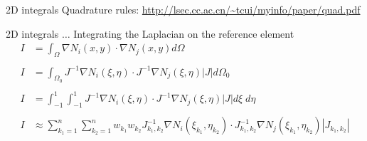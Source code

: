 \documentclass[handout]{beamer}
{
\usepackage{fullpage}
\usepackage{hyperref}
\usepackage{amssymb} 
}
\begin{document}
\begin{frame}{2D integrals}
  \centering
Quadrature rules:
\url{http://lsec.cc.ac.cn/~tcui/myinfo/paper/quad.pdf}

\end{frame}

\begin{frame}{2D integrals $\ldots$}
Integrating the Laplacian on the reference element
\begin{align*}
I &= \int_{\Omega} \nabla N_i(x,y) \cdot \nabla N_j(x,y) d \Omega \\ \\
I &= \int_{\Omega_0} J^{-1} \nabla N_i (\xi, \eta) \cdot J^{-1}\nabla N_j (\xi, \eta) |J| d \Omega_0 \\ \\
I &= \int_{-1}^1 \int_{-1}^1 J^{-1} \nabla N_i(\xi, \eta) \cdot J^{-1}\nabla N_j(\xi, \eta) |J| d \xi \; d \eta \\ \\
I &\approx \sum_{k_1=1}^n \sum_{k_2=1}^n w_{k_1} w_{k_2} J^{-1}_{k_1,k_2} \nabla N_i(\xi_{k_1}, \eta_{k_2}) \cdot J^{-1}_{k_1,k_2} \nabla N_j(\xi_{k_1}, \eta_{k_2}) |J_{k_1,k_2}|\\
\end{align*}

\end{frame}
\end{document}
